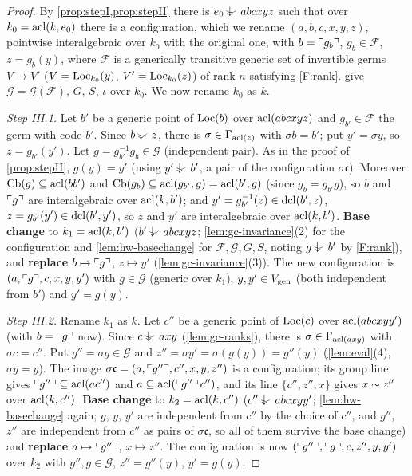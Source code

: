 \begin{proof}
By \cref{prop:stepI,prop:stepII} there is $e_0\ind{}abcxyz$ such that over
$k_0=\operatorname{acl}(k,e_0)$ there is a configuration, which we rename $(a,b,c,x,y,z)$, pointwise
interalgebraic over $k_0$ with the original one, with $b=\ulcorner g_b\urcorner$, $g_b\in\mathcal F$,
$z=g_b(y)$, where $\mathcal F$ is a generically transitive generic set of invertible
germs $V\to V'$ ($V=\operatorname{Loc}_{k_0}(y)$, $V'=\operatorname{Loc}_{k_0}(z)$) of rank $n$ satisfying
\ref{F:rank}.   give $\mathcal G=\mathcal G(\mathcal F)$, $G$, $S$,
$\iota$ over $k_0$.  We now rename $k_0$ as $k$.

\emph{Step III.1.}  Let $b'$ be a generic point of $\operatorname{Loc}(b)$ over $\operatorname{acl}(abcxyz)$ and
$g_{b'}\in\mathcal F$ the germ with code $b'$.  Since $b\ind{}z$, there is
$\sigma\in\Gamma_{\operatorname{acl}(z)}$ with $\sigma b=b'$; put $y'=\sigma y$, so $z=g_{b'}(y')$.
Let $g=g_{b'}^{-1}g_b\in\mathcal G$ (independent pair).  As in the proof of
\cref{prop:stepII}, $g(y)=y'$ (using $y'\ind{}b'$, a pair of the configuration
$\sigma\mathfrak c$).  Moreover $\operatorname{Cb}(g)\subseteq\operatorname{acl}(bb')$ and
$\operatorname{Cb}(g_b)\subseteq\operatorname{acl}(g_{b'},g)=\operatorname{acl}(b',g)$ (since $g_b=g_{b'}g$), so $b$ and $\ulcorner g\urcorner$ are
interalgebraic over $\operatorname{acl}(k,b')$; and $y'=g_{b'}^{-1}(z)\in\operatorname{dcl}(b',z)$, $z=g_{b'}(y')\in\operatorname{dcl}(b',y')$,
so $z$ and $y'$ are interalgebraic over $\operatorname{acl}(k,b')$.  \textbf{Base change} to
$k_1=\operatorname{acl}(k,b')$ ($b'\ind{}abcxyz$; \cref{lem:gc-invariance}(2) for the configuration and
\cref{lem:hw-basechange} for $\mathcal F,\mathcal G,G,S$, noting $g\ind{}b'$ by
\ref{F:rank}), and \textbf{replace} $b\mapsto\ulcorner g\urcorner$, $z\mapsto y'$
(\cref{lem:gc-invariance}(3)).  The new configuration is $(a,\ulcorner g\urcorner,c,x,y,y')$ with
$g\in\mathcal G$ (generic over $k_1$), $y,y'\in V_{\operatorname{gen}}$ (both independent from $b'$) and
$y'=g(y)$.

\emph{Step III.2.}  Rename $k_1$ as $k$.  Let $c''$ be a generic point of $\operatorname{Loc}(c)$ over
$\operatorname{acl}(abcxyy')$ (with $b=\ulcorner g\urcorner$ now).  Since $c\ind{}axy$ (\cref{lem:gc-ranks}), there is
$\sigma\in\Gamma_{\operatorname{acl}(axy)}$ with $\sigma c=c''$.  Put $g''=\sigma g\in\mathcal G$ and
$z''=\sigma y'=\sigma(g(y))=g''(y)$ (\cref{lem:eval}(4), $\sigma y=y$).  The image
$\sigma\mathfrak c=(a,\ulcorner g''\urcorner,c'',x,y,z'')$ is a configuration; its group line gives
$\ulcorner g''\urcorner\subseteq\operatorname{acl}(ac'')$ and $a\subseteq\operatorname{acl}(\ulcorner g''\urcorner\,c'')$, and its line
$\{c'',z'',x\}$ gives $x\sim z''$ over $\operatorname{acl}(k,c'')$.  \textbf{Base change} to
$k_2=\operatorname{acl}(k,c'')$ ($c''\ind{}abcxyy'$; \cref{lem:hw-basechange} again; $g$, $y$, $y'$
are independent from $c''$ by the choice of $c''$, and $g''$, $z''$ are independent from
$c''$ as pairs of $\sigma\mathfrak c$, so all of them survive the base change) and
\textbf{replace} $a\mapsto\ulcorner g''\urcorner$, $x\mapsto z''$.  The configuration is now
$(\ulcorner g''\urcorner,\ulcorner g\urcorner,c,z'',y,y')$ over $k_2$ with $g'',g\in\mathcal G$, $z''=g''(y)$,
$y'=g(y)$.


\end{proof}
